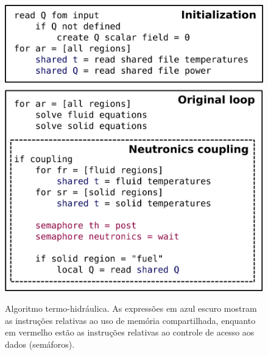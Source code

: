 \begin{figure}[htb]
  \caption{Algoritmo termo-hidráulica. As expressões em azul escuro mostram as instruções relativas
    ao uso de memória compartilhada, enquanto em vermelho estão as instruções relativas ao
  controle de acesso aos dados (semáforos).}
  \centering\includegraphics[scale=0.5]{figuras/algoritmo_openfoam.png}
  \label{fig:algo_th}
\end{figure}


